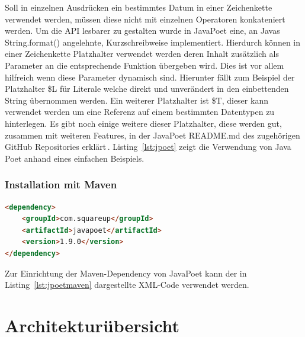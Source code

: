 \documentclass[12pt,oneside,a4paper,parskip]{scrbook}
\begin{document}
Soll in einzelnen Ausdrücken ein bestimmtes Datum in einer Zeichenkette verwendet werden, müssen diese nicht mit einzelnen Operatoren konkateniert werden. Um die API lesbarer zu gestalten wurde in JavaPoet eine, an Javas String.format() angelehnte, Kurzschreibweise implementiert. Hierdurch können in einer Zeichenkette Platzhalter verwendet werden deren Inhalt zusätzlich als Parameter an die entsprechende Funktion übergeben wird. Dies ist vor allem hilfreich wenn diese Parameter dynamisch sind. Hierunter fällt zum Beispiel der Platzhalter \$L für Literale welche direkt und unverändert in den einbettenden String übernommen werden. Ein weiterer Platzhalter ist \$T, dieser kann verwendet werden um eine Referenz auf einem bestimmten Datentypen zu hinterlegen. Es gibt noch einige weitere dieser Platzhalter, diese werden gut, zusammen mit weiteren Features, in der JavaPoet README.md des zugehörigen GitHub Repositories erklärt\,\cite{javapoet2017}. Listing~\ref{lst:jpoet} zeigt die Verwendung von Java Poet anhand eines einfachen Beispiels.

\subsubsection{Installation mit Maven}

\begin{lstlisting}[label=lst:jpoetmaven,
language=HTML,
firstnumber=1,
caption=XML-Code zum Einbinden von JavaPoet als Maven-Dependency.]
<dependency>
	<groupId>com.squareup</groupId>
	<artifactId>javapoet</artifactId>
	<version>1.9.0</version>
</dependency>
\end{lstlisting}

Zur Einrichtung der Maven-Dependency von JavaPoet kann der in Listing~\ref{lst:jpoetmaven} dargestellte XML-Code verwendet werden. 

\section{Architekturübersicht}
\end{document}
